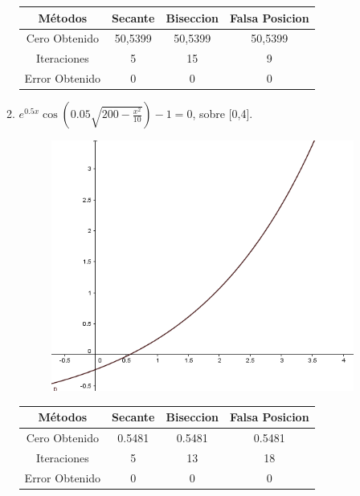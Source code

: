 \documentclass{udpreport}
\begin{document}
\begin{enumerate}
\begin{enumerate}
\begin{table}[H]
\begin{tabular} { |c|c|c|c|}
                \hline
                Métodos       & Secante & Biseccion & Falsa Posicion  \\
                \hline
                Cero Obtenido &  50,5399       &    50,5399       &      50,5399          \\
                \hline
                Iteraciones   &     5        &      15     &        9        \\
                \hline
                Error Obtenido &    0       &       0       &       0   \\
                \hline 
                
                \end{tabular}
            \end{table}
    \newpage
    
    \item \(e^{0.5x}\cos(0.05\sqrt{200-\frac{x^2}{10}}) -1 = 0 \), sobre [0,4].\\
        
        \begin{figure}[H]
        \centering
        \includegraphics[width=10cm]{GraficoEj1d}
        \end{figure}
        \begin{table}[H]
        \centering
            \begin{tabular} { |c|c|c|c|}
            
            \hline
            Métodos       & Secante & Biseccion & Falsa Posicion \\
            \hline
            Cero Obtenido &  0.5481       &    0.5481       &      0.5481          \\
            \hline
            Iteraciones   &     5        &      13     &        18       \\
            \hline
            Error Obtenido   &  0 & 0 & 0 \\
            \hline
            

\end{tabular}
\end{table}
\end{enumerate}
\end{enumerate}
\end{document}
